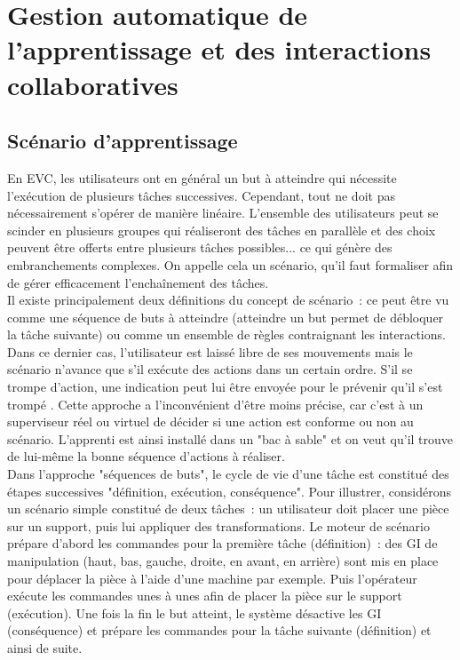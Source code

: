 \documentclass[11pt]{article}
\begin{document}
\section{Gestion automatique de l'apprentissage et des interactions collaboratives}

\subsection{Scénario d'apprentissage}
En EVC, les utilisateurs ont en général un but à atteindre qui nécessite l'exécution de plusieurs tâches successives. Cependant, tout ne doit pas nécessairement s'opérer de manière linéaire. L'ensemble des utilisateurs peut se scinder en plusieurs groupes qui réaliseront des tâches en parallèle et des choix peuvent être offerts entre plusieurs tâches possibles... ce qui génère des embranchements complexes. On appelle cela un scénario, qu'il faut formaliser afin de gérer efficacement l'enchaînement des tâches.
\\

Il existe principalement deux définitions du concept de scénario~: ce peut être vu comme une séquence de buts à atteindre \cite{seven} (atteindre un but permet de débloquer la tâche suivante) ou comme un ensemble de règles contraignant les interactions. Dans ce dernier cas, l'utilisateur est laissé libre de ses mouvements mais le scénario n'avance que s'il exécute des actions dans un certain ordre. S'il se trompe d'action, une indication peut lui être envoyée pour le prévenir qu'il s'est trompé \cite{constrained-scenario}. Cette approche a l'inconvénient d'être moins précise, car c'est à un superviseur réel ou virtuel de décider si une action est conforme ou non au scénario. L'apprenti est ainsi installé dans un "bac à sable" et on veut qu'il trouve de lui-même la bonne séquence d'actions à réaliser.
\\

Dans l'approche "séquences de buts", le cycle de vie d'une tâche est constitué des étapes successives "définition, exécution, conséquence". Pour illustrer, considérons un scénario simple constitué de deux tâches~: un utilisateur doit placer une pièce sur un support, puis lui appliquer des transformations. Le moteur de scénario prépare d'abord les commandes pour la première tâche (définition)~: des GI de manipulation (haut, bas, gauche, droite, en avant, en arrière) sont mis en place pour déplacer la pièce à l'aide d'une machine par exemple. Puis l'opérateur exécute les commandes unes à unes afin de placer la pièce sur le support (exécution). Une fois la fin le but atteint, le système désactive les GI (conséquence) et prépare les commandes pour la tâche suivante (définition) et ainsi de suite.
\\
\end{document}
